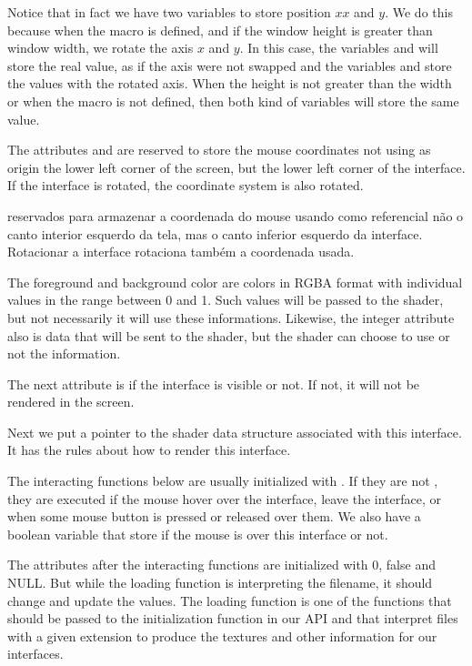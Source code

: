 Notice that in fact we have two variables to store position $xx$ and
$y$. We do this because when the
macro  is defined, and if the window
height is greater than window width, we rotate the axis $x$ and
$y$. In this case, the variables  and 
will store the real value, as if the axis were not swapped and the
variables  and  store the values with the
rotated axis. When the height is not greater than the width or when
the macro is not defined, then both kind of variables will store the
same value.

The attributes  and  are
reserved to store the mouse coordinates not using as origin the lower
left corner of the screen, but the lower left corner of the
interface. If the interface is rotated, the coordinate system is also
rotated.

reservados para armazenar a coordenada do mouse usando como
referencial não o canto interior esquerdo da tela, mas o canto
inferior esquerdo da interface. Rotacionar a interface rotaciona
também a coordenada usada.


The foreground and background color are colors in RGBA format with
individual values in the range between 0 and 1. Such values will be
passed to the shader, but not necessarily it will use these
informations. Likewise, the integer attribute also is data that will
be sent to the shader, but the shader can choose to use or not the
information.

The next attribute is if the interface is visible or not. If not, it
will not be rendered in the screen.

Next we put a pointer to the shader data structure associated with
this interface. It has the rules about how to render this interface.

The interacting functions below are usually initialized
with . If they are not , they are
executed if the mouse hover over the interface, leave the interface,
or when some mouse button is pressed or released over them. We also
have a boolean variable that store if the mouse is over this interface
or not.

The attributes after the interacting functions are initialized with 0,
false and NULL. But while the loading function is interpreting the
filename, it should change and update the values. The loading function
is one of the functions that should be passed to the initialization
function in our API and that interpret files with a given extension to
produce the textures and other information for our interfaces.


